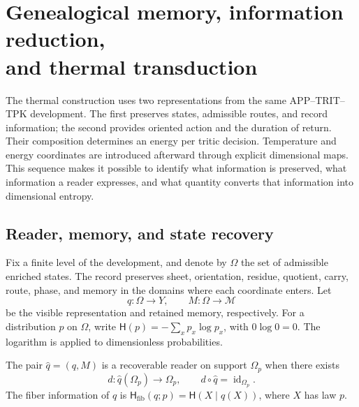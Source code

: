 
\section[Genealogical memory, information reduction, and thermal transduction]{Genealogical memory, information reduction,\\and thermal transduction}
\label{v:ant:sec:ii-kb-aut-desarrollo}

The thermal construction uses two representations from the same
APP--TRIT--TPK development. The first preserves states, admissible routes,
and record information; the second provides oriented action
and the duration of return. Their composition determines an energy per
tritic decision. Temperature and energy coordinates are introduced
afterward through explicit dimensional maps. This sequence
makes it possible to identify what information is preserved, what information a reader
expresses, and what quantity converts that information into dimensional entropy.

\subsection{Reader, memory, and state recovery}

Fix a finite level of the development, and denote by \(\Omega\) the
set of admissible enriched states. The record preserves sheet,
orientation, residue, quotient, carry, route, phase, and memory in the
domains where each coordinate enters. Let
\[
 q:\Omega\longrightarrow Y,\qquad
 M:\Omega\longrightarrow\mathcal M
\]
be the visible representation and retained memory, respectively. For a
distribution \(p\) on \(\Omega\), write
\(\mathsf H(p)=-\sum_xp_x\log p_x\), with \(0\log0=0\).
The logarithm is applied to dimensionless probabilities.

\begin{definition}
The pair \(\widehat q=(q,M)\) is a recoverable reader on support
\(\Omega_p\) when there exists
\[
 d:\widehat q(\Omega_p)\longrightarrow\Omega_p,
 \qquad d\circ\widehat q=\operatorname{id}_{\Omega_p}.
\]
The fiber information of \(q\) is
\(\mathsf H_{\mathrm{fib}}(q;p)=\mathsf H(X\mid q(X))\), where
\(X\) has law \(p\).
\end{definition}

